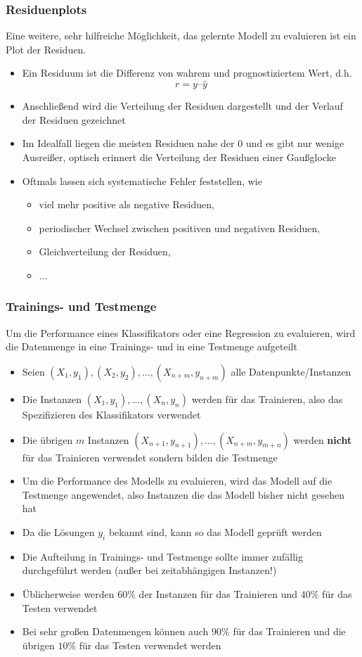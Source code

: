\begin{frame}
\frametitle{Residuenplots}
Eine weitere, sehr hilfreiche Möglichkeit, das gelernte Modell zu evaluieren ist ein Plot der Residuen.
\begin{itemize}[<+->]
\item Ein Residuum ist die Differenz von wahrem und prognostiziertem Wert, d.h. 
\[ r = y – \hat{y} \]
\item Anschließend wird die Verteilung der Residuen dargestellt und der Verlauf der Residuen gezeichnet
\item Im Idealfall liegen die meisten Residuen nahe der $0$ und es gibt nur wenige Ausreißer, optisch erinnert die Verteilung der Residuen einer Gaußglocke
\item Oftmals lassen sich systematische Fehler feststellen, wie 
\begin{itemize}[<+->]
\item viel mehr positive als negative Residuen, 
\item periodischer Wechsel zwischen positiven und negativen Residuen, 
\item Gleichverteilung der Residuen,
\item ...
\end{itemize}
\end{itemize}
\end{frame}
\begin{frame}
\frametitle{Trainings- und Testmenge}
Um die Performance eines Klassifikators oder eine Regression zu evaluieren, wird die Datenmenge in eine Trainings- und in eine Testmenge aufgeteilt
\begin{itemize}[<+->]
\item Seien $(X_1,y_1),(X_2,y_2),\ldots,(X_{n+m},y_{n+m})$ alle Datenpunkte/Instanzen
\item Die Instanzen $(X_1,y_1),\ldots,(X_n,y_n)$ werden für das Trainieren, also das Spezifizieren des Klassifikators verwendet
\item Die übrigen $m$ Instanzen $(X_{n+1},y_{n+1}),\ldots,(X_{n+m},y_{m+n})$ werden \textbf{nicht} für das Trainieren verwendet sondern bilden die Testmenge
\item Um die Performance des Modells zu evaluieren, wird das Modell auf die Testmenge angewendet, also Instanzen die das Modell bisher nicht gesehen hat
\item Da die Lösungen $y_i$ bekannt sind, kann so das Modell geprüft werden
\item Die Aufteilung in Trainings- und Testmenge sollte immer zufällig durchgeführt werden (außer bei zeitabhängigen Instanzen!)
\item Üblicherweise werden $60\%$ der Instanzen für das Trainieren und $40\%$ für das Testen verwendet
\item Bei sehr großen Datenmengen können auch $90\%$ für das Trainieren und die übrigen $10\%$ für das Testen verwendet werden
\end{itemize}
\end{frame}
